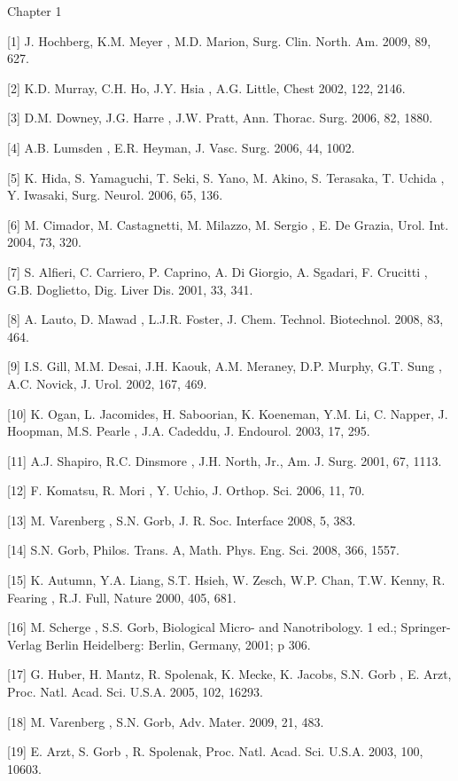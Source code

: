 {\Large Chapter 1}

[1]	J. Hochberg, K.M. Meyer , M.D. Marion, Surg. Clin. North. Am. 2009, 89, 627.

[2]	K.D. Murray, C.H. Ho, J.Y. Hsia , A.G. Little, Chest 2002, 122, 2146.

[3]	D.M. Downey, J.G. Harre , J.W. Pratt, Ann. Thorac. Surg. 2006, 82, 1880.

[4]	A.B. Lumsden , E.R. Heyman, J. Vasc. Surg. 2006, 44, 1002.

[5]	K. Hida, S. Yamaguchi, T. Seki, S. Yano, M. Akino, S. Terasaka, T. Uchida , Y. Iwasaki, Surg. Neurol. 2006, 65, 136.

[6]	M. Cimador, M. Castagnetti, M. Milazzo, M. Sergio , E. De Grazia, Urol. Int. 2004, 73, 320.

[7]	S. Alfieri, C. Carriero, P. Caprino, A. Di Giorgio, A. Sgadari, F. Crucitti , G.B. Doglietto, Dig. Liver Dis. 2001, 33, 341.

[8]	A. Lauto, D. Mawad , L.J.R. Foster, J. Chem. Technol. Biotechnol. 2008, 83, 464.

[9]	I.S. Gill, M.M. Desai, J.H. Kaouk, A.M. Meraney, D.P. Murphy, G.T. Sung , A.C. Novick, J. Urol. 2002, 167, 469.

[10]	K. Ogan, L. Jacomides, H. Saboorian, K. Koeneman, Y.M. Li, C. Napper, J. Hoopman, M.S. Pearle , J.A. Cadeddu, J. Endourol. 2003, 17, 295.

[11]	A.J. Shapiro, R.C. Dinsmore , J.H. North, Jr., Am. J. Surg. 2001, 67, 1113.

[12]	F. Komatsu, R. Mori , Y. Uchio, J. Orthop. Sci. 2006, 11, 70.

[13]	M. Varenberg , S.N. Gorb, J. R. Soc. Interface 2008, 5, 383.

[14]	S.N. Gorb, Philos. Trans. A, Math. Phys. Eng. Sci. 2008, 366, 1557.

[15]	K. Autumn, Y.A. Liang, S.T. Hsieh, W. Zesch, W.P. Chan, T.W. Kenny, R. Fearing , R.J. Full, Nature 2000, 405, 681.

[16]	M. Scherge , S.S. Gorb, Biological Micro- and Nanotribology. 1 ed.; Springer-Verlag Berlin Heidelberg: Berlin, Germany, 2001; p 306.

[17]	G. Huber, H. Mantz, R. Spolenak, K. Mecke, K. Jacobs, S.N. Gorb , E. Arzt, Proc. Natl. Acad. Sci. U.S.A. 2005, 102, 16293.

[18]	M. Varenberg , S.N. Gorb, Adv. Mater. 2009, 21, 483.

[19]	E. Arzt, S. Gorb , R. Spolenak, Proc. Natl. Acad. Sci. U.S.A. 2003, 100, 10603.

